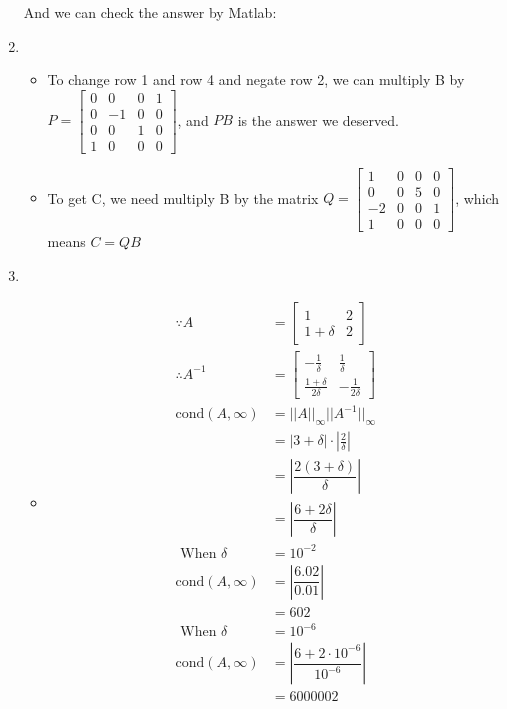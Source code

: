 \documentclass{article}
\begin{document}
\begin{enumerate}
And we can check the answer by Matlab:


\item
\begin{itemize}
\item
To change row 1 and row 4 and negate row 2, we can multiply B by $ P=\begin{bmatrix}
0&0&0&1\\0&-1&0&0\\0&0&1&0\\1&0&0&0
\end{bmatrix} $, and $PB$ is the answer we deserved.
\item 
To get C, we need multiply B by the matrix $Q=\begin{bmatrix}
1&0&0&0\\0&0&5&0\\-2&0&0&1\\1&0&0&0
\end{bmatrix}$, which means $ C = QB$
\end{itemize}
\item
\begin{itemize}
\item
\begin{align*}
\because A&=\begin{bmatrix}
1&2\\1+\delta&2
\end{bmatrix}\\\therefore A^{-1} &=\begin{bmatrix}
-\frac{1}{\delta}&\frac{1}{\delta}\\
\frac{1+\delta}{2\delta}&-\frac{1}{2\delta}
\end{bmatrix}\\
\mbox{cond}(A,\infty)&=||A||_\infty||A^{-1}||_\infty \\&=|3+\delta|\cdot|\frac{2}{\delta}|\\&=\left|\dfrac{2(3+\delta)}{\delta}\right|\\&=\left|\dfrac{6+2\delta}{\delta}\right|\\
\mbox{ When }\delta &=10^{-2}\\
\mbox{cond}(A,\infty)&=\left|\dfrac{6.02}{0.01}\right|\\&=602\\
\mbox{ When }\delta &=10^{-6}\\
\mbox{cond}(A,\infty)&=\left|\dfrac{6+2\cdot 10^{-6}}{ 10^{-6}}\right|\\&=6000002\\

\end{align*}
\end{itemize}
\end{enumerate}
\end{document}
